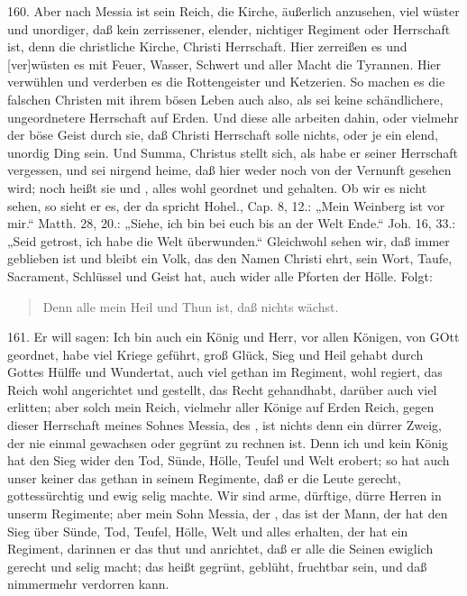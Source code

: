 160. Aber nach Messia ist sein Reich, die Kirche, äußerlich anzusehen, viel wüster und unordiger, daß kein zerrissener, elender, nichtiger Regiment oder Herrschaft ist, denn die christliche Kirche, Christi Herrschaft. Hier zerreißen es und [ver]wüsten es mit Feuer, Wasser, Schwert und aller Macht die Tyrannen. Hier verwühlen und verderben es die Rottengeister und Ketzerien. So machen es die falschen Christen mit ihrem bösen Leben auch also, als sei keine schändlichere, ungeordnetere Herrschaft auf Erden. Und diese alle arbeiten dahin, oder vielmehr der böse Geist durch sie, daß Christi Herrschaft solle nichts, oder je ein elend, unordig Ding sein. Und Summa, Christus stellt sich, als habe er seiner Herrschaft vergessen, und sei nirgend heime, daß hier weder  noch  von der Vernunft gesehen wird; noch heißt sie  und , alles wohl geordnet und gehalten. Ob wir es nicht sehen, so sieht er es, der da spricht Hohel., Cap. 8, 12.: „Mein Weinberg ist vor mir.“ Matth. 28, 20.: „Siehe, ich bin bei euch bis an der Welt Ende.“ Joh. 16, 33.: „Seid getrost, ich habe die Welt überwunden.“ Gleichwohl sehen wir, daß immer geblieben ist und bleibt ein Volk, das den Namen Christi ehrt, sein Wort, Taufe, Sacrament, Schlüssel und Geist hat, auch wider alle Pforten der Hölle. Folgt:

\begin{quote}
Denn alle mein Heil und Thun ist, daß nichts wächst.
\end{quote}

161. Er will sagen: Ich bin auch ein König und Herr, vor allen Königen, von GOtt geordnet, habe viel Kriege geführt, groß Glück, Sieg und Heil gehabt durch Gottes Hülffe und Wundertat, auch viel gethan im Regiment, wohl regiert, das Reich wohl angerichtet und gestellt, das Recht gehandhabt, darüber auch viel erlitten; aber solch mein Reich, vielmehr aller Könige auf Erden Reich, gegen dieser Herrschaft meines Sohnes Messia, des , ist nichts denn ein dürrer Zweig, der nie einmal gewachsen oder gegrünt zu rechnen ist. Denn ich und kein König hat den Sieg wider den Tod, Sünde, Hölle, Teufel und Welt erobert; so hat auch unser keiner das gethan in seinem Regimente, daß er die Leute gerecht, gottessürchtig und ewig selig machte. Wir sind arme, dürftige, dürre Herren in unserm Regimente; aber mein Sohn Messia, der , das ist der Mann, der hat den Sieg über Sünde, Tod, Teufel, Hölle, Welt und alles erhalten, der hat ein Regiment, darinnen er das thut und anrichtet, daß er alle die Seinen ewiglich gerecht und selig macht; das heißt gegrünt, geblüht, fruchtbar sein, und daß nimmermehr verdorren kann.

